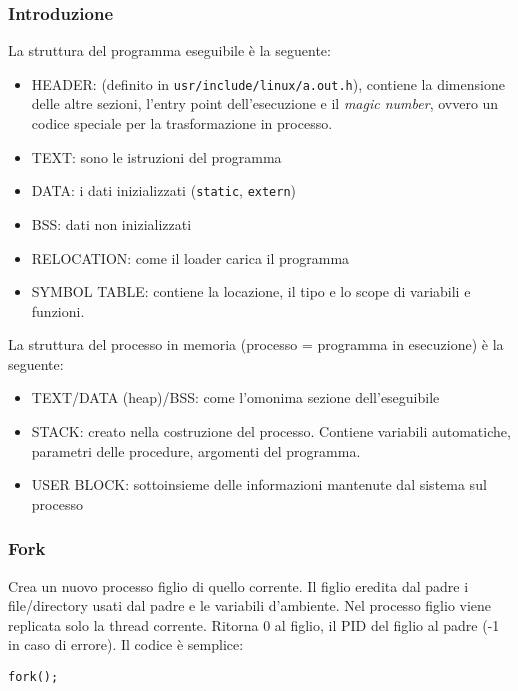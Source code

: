 \documentclass[a4paper, 10pt]{article}
\begin{document}
\subsubsection{Introduzione}
La struttura del programma eseguibile è la seguente:
\begin{itemize}
\item HEADER: (definito in \verb|usr/include/linux/a.out.h|), contiene la dimensione delle altre sezioni, l'entry point dell'esecuzione e il \textit{magic number}, ovvero un codice speciale per la trasformazione in processo.
\item TEXT: sono le istruzioni del programma
\item DATA: i dati inizializzati (\verb|static|, \verb|extern|)
\item BSS: dati non inizializzati
\item RELOCATION: come il loader carica il programma
\item SYMBOL TABLE: contiene la locazione, il tipo e lo scope di variabili e funzioni.
\end{itemize}
La struttura del processo in memoria (processo = programma in esecuzione) è la seguente:
\begin{itemize}
\item TEXT/DATA (heap)/BSS: come l'omonima sezione dell'eseguibile
\item STACK: creato nella costruzione del processo. Contiene variabili automatiche, parametri delle procedure, argomenti del programma.
\item USER BLOCK: sottoinsieme delle informazioni mantenute dal sistema sul processo
\end{itemize}

\subsubsection{Fork}
Crea un nuovo processo figlio di quello corrente. Il figlio eredita dal padre i file/directory usati dal padre e le variabili d'ambiente.
Nel processo figlio viene replicata solo la thread corrente.
Ritorna 0 al figlio, il PID del figlio al padre (-1 in caso di errore).
Il codice è semplice:
\begin{verbatim}
fork();
\end{verbatim}
\end{document}
